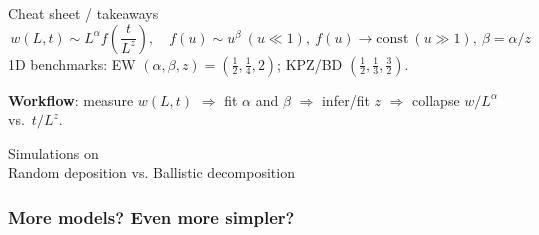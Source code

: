 \documentclass[9pt,table,xcolor=dvipsnames]{beamer}
\begin{document}
\begin{frame}[t]{Cheat sheet / takeaways}
\small
\[
\boxed{\,w(L,t)\sim L^{\alpha} f\!\left(\dfrac{t}{L^{z}}\right),\quad
f(u)\sim u^{\beta}\ (u\!\ll\!1),\ f(u)\to\text{const}\ (u\!\gg\!1),\ 
\beta=\alpha/z\,}
\]
1D benchmarks: EW $(\alpha,\beta,z)=(\tfrac12,\tfrac14,2)$; KPZ/BD $(\tfrac12,\tfrac13,\tfrac32)$.
\medskip

\textbf{Workflow}: measure $w(L,t)$ $\Rightarrow$ fit $\alpha$ and $\beta$ $\Rightarrow$ infer/fit $z$ $\Rightarrow$ collapse $w/L^\alpha$ vs.\ $t/L^z$.
\end{frame}
\begin{frame}[fragile] %
  \begin{center}
    \Large Simulations on \\ \bigskip
    Random deposition vs. Ballistic decomposition
  \end{center}
\end{frame}
\begin{frame}[fragile] %
  \frametitle{More models? Even more simpler?}

  \begin{center}
  \end{center}

\end{frame}
\end{document}
